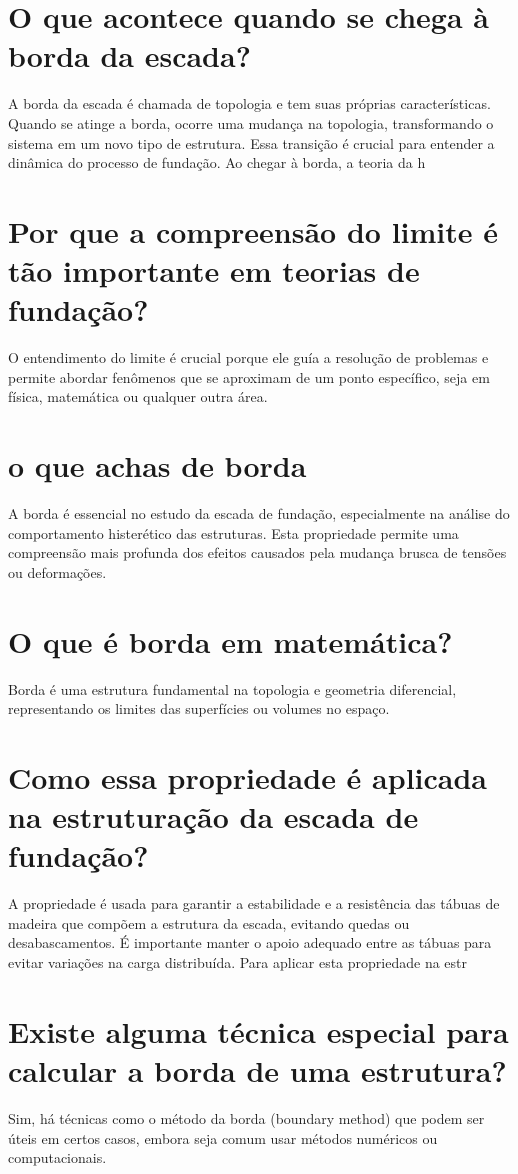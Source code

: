 \documentclass[11pt,a4paper]{article}
\begin{document}
\section{O que acontece quando se chega à borda da escada?}
A borda da escada é chamada de topologia e tem suas próprias características. Quando se atinge a borda, ocorre uma mudança na topologia, transformando o sistema em um novo tipo de estrutura. Essa transição é crucial para entender a dinâmica do processo de fundação. Ao chegar à borda, a teoria da h

\section{Por que a compreensão do limite é tão importante em teorias de fundação?}
O entendimento do limite é crucial porque ele guía a resolução de problemas e permite abordar fenômenos que se aproximam de um ponto específico, seja em física, matemática ou qualquer outra área.

\section{o que achas de borda}
A borda é essencial no estudo da escada de fundação, especialmente na análise do comportamento histerético das estruturas. Esta propriedade permite uma compreensão mais profunda dos efeitos causados pela mudança brusca de tensões ou deformações.

\section{O que é borda em matemática?}
Borda é uma estrutura fundamental na topologia e geometria diferencial, representando os limites das superfícies ou volumes no espaço.

\section{Como essa propriedade é aplicada na estruturação da escada de fundação?}
A propriedade é usada para garantir a estabilidade e a resistência das tábuas de madeira que compõem a estrutura da escada, evitando quedas ou desabascamentos. É importante manter o apoio adequado entre as tábuas para evitar variações na carga distribuída. Para aplicar esta propriedade na estr

\section{Existe alguma técnica especial para calcular a borda de uma estrutura?}
Sim, há técnicas como o método da borda (boundary method) que podem ser úteis em certos casos, embora seja comum usar métodos numéricos ou computacionais.
\end{document}
